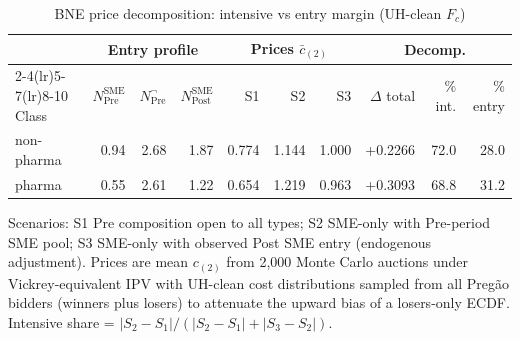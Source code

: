 \begin{table}[htbp]
\centering
\begin{threeparttable}
\caption{BNE price decomposition: intensive vs entry margin (UH-clean $F_c$)}
\label{tab:v3_bne_decomp}
\small
\begin{tabular}{lrrrrrrrrr}
\toprule
 & \multicolumn{3}{c}{Entry profile} & \multicolumn{3}{c}{Prices $\bar c_{(2)}$} & \multicolumn{3}{c}{Decomp.} \\
\cmidrule(lr){2-4}\cmidrule(lr){5-7}\cmidrule(lr){8-10}
Class & $N^{\text{SME}}_{\text{Pre}}$ & $N^{\neg}_{\text{Pre}}$ & $N^{\text{SME}}_{\text{Post}}$ & S1 & S2 & S3 & $\Delta$ total & \% int. & \% entry \\
\midrule
non-pharma & 0.94 & 2.68 & 1.87 & 0.774 & 1.144 & 1.000 & +0.2266 & 72.0 & 28.0 \\
pharma & 0.55 & 2.61 & 1.22 & 0.654 & 1.219 & 0.963 & +0.3093 & 68.8 & 31.2 \\
\bottomrule
\end{tabular}
\begin{tablenotes}\footnotesize
\item Scenarios: S1 Pre composition open to all types; S2 SME-only
with Pre-period SME pool; S3 SME-only with observed Post SME
entry (endogenous adjustment). Prices are mean $c_{(2)}$ from 2{,}000
Monte Carlo auctions under Vickrey-equivalent IPV with UH-clean
cost distributions sampled from all Preg\~ao bidders (winners plus
losers) to attenuate the upward bias of a losers-only ECDF.
Intensive share = $|S_2 - S_1| / (|S_2-S_1| + |S_3-S_2|)$.
\end{tablenotes}
\end{threeparttable}
\end{table}
